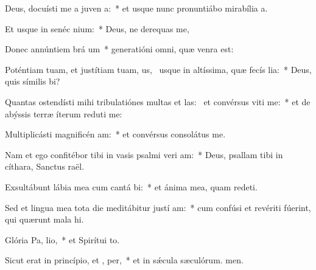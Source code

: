 \item Deus, docuísti me a juven a:~* et usque nunc pronuntiábo mirabília a.
\item Et usque in senéc  nium:~* Deus, ne derequas me,
\item Donec annúntiem brá um~* generatióni omni, quæ venra est:
\item Poténtiam tuam, et justítiam tuam, us,~\pscross{} usque in altíssima, quæ fecís lia:~* Deus, quis símilis bi?
\item Quantas ostendísti mihi tribulatiónes multas et las:~\pscross{} et convérsus viti me:~* et de abýssis terræ íterum reduti me:
\item Multiplicásti magnificén am:~* et convérsus consolátus  me.
\item Nam et ego confitébor tibi in vasis psalmi veri am:~* Deus, psallam tibi in cíthara, Sanctus raël.
\item Exsultábunt lábia mea cum cantá bi:~* et ánima mea, quam redeti.
\item Sed et lingua mea tota die meditábitur justí am:~* cum confúsi et revériti fúerint, qui quærunt mala hi.
\item Glória Pa,  lio,~* et Spirítui to.
\item Sicut erat in princípio, et ,  per,~* et in sǽcula sæculórum. men.
